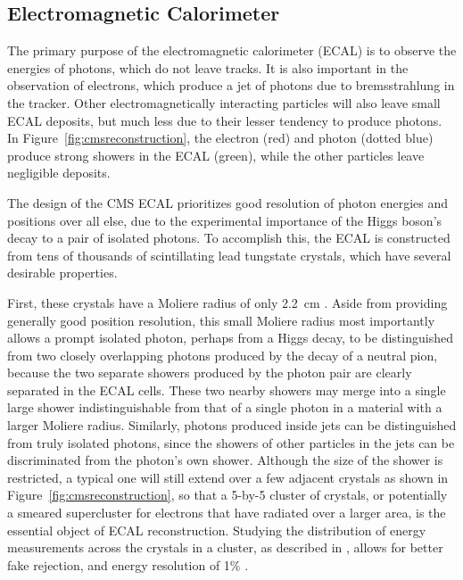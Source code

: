   \subsection{Electromagnetic Calorimeter} \label{sec:ecal}

  The primary purpose of the electromagnetic calorimeter (ECAL) is to observe the energies of photons, which do not leave tracks.
  It is also important in the observation of electrons, which produce a jet of photons due to bremsstrahlung in the tracker.
  Other electromagnetically interacting particles will also leave small ECAL deposits, but much less due to their lesser tendency to produce photons.
  In Figure~\ref{fig:cmsreconstruction}, the electron (red) and photon (dotted blue) produce strong showers in the ECAL (green), while the other particles leave negligible deposits.

  The design of the CMS ECAL prioritizes good resolution of photon energies and positions over all else, due to the experimental importance of the Higgs boson's decay to a pair of isolated photons.
  To accomplish this, the ECAL is constructed from tens of thousands of scintillating lead tungstate crystals, which have several desirable properties.

  First, these crystals have a Moliere radius of only 2.2~cm \cite{cms_tdr}.
  Aside from providing generally good position resolution, this small Moliere radius most importantly allows a prompt isolated photon, perhaps from a Higgs decay, to be distinguished from two closely overlapping photons produced by the decay of a neutral pion, because the two separate showers produced by the photon pair are clearly separated in the ECAL cells.
  These two nearby showers may merge into a single large shower indistinguishable from that of a single photon in a material with a larger Moliere radius.
  Similarly, photons produced inside jets can be distinguished from truly isolated photons, since the showers of other particles in the jets can be discriminated from the photon's own shower.
  Although the size of the shower is restricted, a typical one will still extend over a few adjacent crystals as shown in Figure~\ref{fig:cmsreconstruction}, so that a 5-by-5 cluster of crystals, or potentially a smeared supercluster for electrons that have radiated over a larger area, is the essential object of ECAL reconstruction.
  Studying the distribution of energy measurements across the crystals in a cluster, as described in \cite{ecal_algorithm}, allows for better fake rejection, and energy resolution of 1\% \cite{ecal_energy_reco}.

